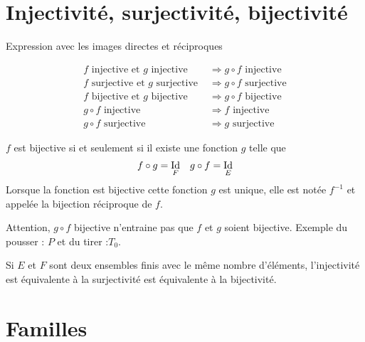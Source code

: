 \section{Injectivité, surjectivité, bijectivité}
Expression avec les images directes et réciproques
\begin{prop}
 \begin{align*}
  f \text{ injective et } g \text{ injective } &\Rightarrow g\circ f \text{ injective} \\
  f \text{ surjective et } g \text{ surjective } &\Rightarrow g\circ f \text{ surjective} \\
  f \text{ bijective et } g \text{ bijective } &\Rightarrow g\circ f \text{ bijective} \\
  g\circ f \text{ injective } &\Rightarrow f \text{ injective} \\
  g\circ f \text{ surjective } &\Rightarrow g \text{ surjective} 
 \end{align*}
\end{prop}
\begin{demo}
 
\end{demo}

\begin{prop}
 $f$ est bijective si et seulement si il existe une fonction $g$ telle que
\begin{align*}
 f\circ g =\mathop{\mathrm{Id}} _F & & g\circ f = \mathop{\mathrm{Id}} _E
\end{align*}
Lorsque la fonction est bijective cette fonction $g$ est unique, elle est notée $f^{-1}$ et appelée la bijection réciproque de $f$.
\end{prop}
\begin{demo}
 
\end{demo}
\begin{rem}
 Attention, $g\circ f$ bijective n'entraine pas que $f$ et $g$ soient bijective. Exemple du \og pousser \fg : $P$ et du \og tirer \fg :$T_0$.
\end{rem}

\begin{prop}
 Si $E$ et $F$ sont deux ensembles finis avec le même nombre d'éléments, l'injectivité est équivalente à la surjectivité est équivalente à la bijectivité.
\end{prop}

\section{Familles}


